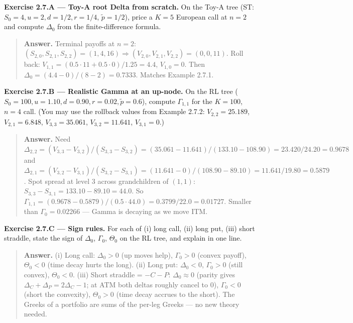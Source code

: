 \documentclass[
  10pt,
  twoside]{book}
\begin{document}
\textbf{Exercise 2.7.A --- Toy-A root Delta from scratch.} On the Toy-A
tree (ST: \(S_0=4, u=2, d=1/2, r=1/4\), \(\tilde p=1/2\)), price a
\(K=5\) European call at \(n=2\) and compute \(\Delta_0\) from the
finite-difference formula.

\begin{quote}
\textbf{Answer.} Terminal payoffs at \(n=2\):
\((S_{2,0}, S_{2,1}, S_{2,2})=(1,4,16)\Rightarrow (V_{2,0},V_{2,1},V_{2,2})=(0,0,11)\).
Roll back: \(V_{1,1}=(0.5\cdot 11+0.5\cdot 0)/1.25=4.4\), \(V_{1,0}=0\).
Then \(\Delta_0=(4.4-0)/(8-2)=\mathbf{0.7333}\). Matches Example 2.7.1.
\end{quote}

\textbf{Exercise 2.7.B --- Realistic Gamma at an up-node.} On the RL
tree (\(S_0=100, u=1.10, d=0.90, r=0.02, \tilde p=0.6\)), compute
\(\Gamma_{1,1}\) for the \(K=100\), \(n=4\) call. (You may use the
rollback values from Example 2.7.2: \(V_{2,2}=25.189\),
\(V_{2,1}=6.848\), \(V_{3,3}=35.061\), \(V_{3,2}=11.641\),
\(V_{3,1}=0\).)

\begin{quote}
\textbf{Answer.} Need
\(\Delta_{2,2}=(V_{3,3}-V_{3,2})/(S_{3,3}-S_{3,2})=(35.061-11.641)/(133.10-108.90)=23.420/24.20=0.9678\)
and
\(\Delta_{2,1}=(V_{3,2}-V_{3,1})/(S_{3,2}-S_{3,1})=(11.641-0)/(108.90-89.10)=11.641/19.80=0.5879\).
Spot spread at level 3 across grandchildren of \((1,1)\):
\(S_{3,3}-S_{3,1}=133.10-89.10=44.0\). So
\(\Gamma_{1,1}=(0.9678-0.5879)/(0.5\cdot 44.0)=0.3799/22.0=\mathbf{0.01727}\).
Smaller than \(\Gamma_0=0.02266\) --- Gamma is decaying as we move ITM.
\end{quote}

\textbf{Exercise 2.7.C --- Sign rules.} For each of (i) long call, (ii)
long put, (iii) short straddle, state the sign of \(\Delta_0\),
\(\Gamma_0\), \(\Theta_0\) on the RL tree, and explain in one line.

\begin{quote}
\textbf{Answer.} (i) Long call: \(\Delta_0>0\) (up moves help),
\(\Gamma_0>0\) (convex payoff), \(\Theta_0<0\) (time decay hurts the
long). (ii) Long put: \(\Delta_0<0\), \(\Gamma_0>0\) (still convex),
\(\Theta_0<0\). (iii) Short straddle = \(-C-P\): \(\Delta_0\approx 0\)
(parity gives \(\Delta_C+\Delta_P=2\Delta_C-1\); at ATM both deltas
roughly cancel to \(0\)), \(\Gamma_0<0\) (short the convexity),
\(\Theta_0>0\) (time decay accrues to the short). The Greeks of a
portfolio are sums of the per-leg Greeks --- no new theory needed.
\end{quote}
\end{document}
